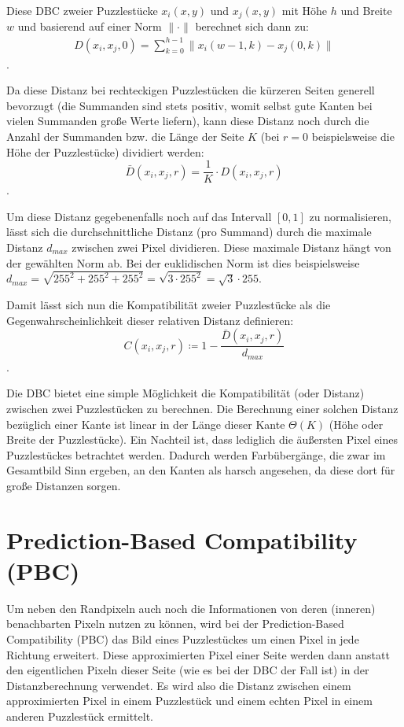 \documentclass{whswinvcbook}
\begin{document}
Diese DBC zweier Puzzlestücke $x_i(x,y)$ und $x_j(x,y)$ mit Höhe $h$ und Breite $w$ und basierend auf einer Norm $\|\cdot\|$ berechnet sich dann zu:
\begin{align} \label{eq-dbc}
    D(x_i,x_j,0)=\sum_{k=0}^{h-1}\|x_i(w-1,k)-x_j(0,k)\|
\end{align}
.

Da diese Distanz bei rechteckigen Puzzlestücken die kürzeren Seiten generell bevorzugt (die Summanden sind stets positiv, womit selbst gute Kanten bei vielen Summanden große Werte liefern), kann diese Distanz noch durch die Anzahl der Summanden bzw. die Länge der Seite $K$ (bei $r=0$ beispielsweise die Höhe der Puzzlestücke) dividiert werden: $$\bar{D}(x_i,x_j,r)=\frac{1}{K}\cdot D(x_i,x_j,r)$$.

Um diese Distanz gegebenenfalls noch auf das Intervall $[0,1]$ zu normalisieren, lässt sich die durchschnittliche Distanz (pro Summand) durch die maximale Distanz $d_{max}$ zwischen zwei Pixel dividieren. Diese maximale Distanz hängt von der gewählten Norm ab. Bei der euklidischen Norm ist dies beispielsweise $d_{max}=\sqrt{255^2+255^2+255^2}=\sqrt{3\cdot255^2}=\sqrt{3}\cdot255$.

Damit lässt sich nun die Kompatibilität zweier Puzzlestücke als die Gegenwahrscheinlichkeit dieser relativen Distanz definieren:$$C(x_i,x_j,r)\coloneqq 1-\frac{\bar{D}(x_i,x_j,r)}{d_{max}}$$.

Die DBC bietet eine simple Möglichkeit die Kompatibilität (oder Distanz) zwischen zwei Puzzlestücken zu berechnen. Die Berechnung einer solchen Distanz bezüglich einer Kante ist linear in der Länge dieser Kante $\Theta(K)$ (Höhe oder Breite der Puzzlestücke). Ein Nachteil ist, dass lediglich die äußersten Pixel eines Puzzlestückes betrachtet werden. Dadurch werden Farbübergänge, die zwar im Gesamtbild Sinn ergeben, an den Kanten als harsch angesehen, da diese dort für große Distanzen sorgen.
\section{Prediction-Based Compatibility (PBC)}
Um neben den Randpixeln auch noch die Informationen von deren (inneren) benachbarten Pixeln nutzen zu können, wird bei der Prediction-Based Compatibility (PBC) das Bild eines Puzzlestückes um einen Pixel in jede Richtung erweitert. Diese approximierten Pixel einer Seite werden dann anstatt den eigentlichen Pixeln dieser Seite (wie es bei der DBC der Fall ist) in der Distanzberechnung verwendet. Es wird also die Distanz zwischen einem approximierten Pixel in einem Puzzlestück und einem echten Pixel in einem anderen Puzzlestück ermittelt.
\end{document}
